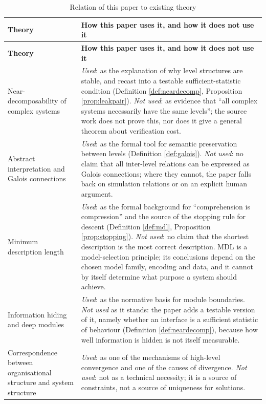\begin{longtable}{L{3.6cm}L{10.8cm}}
\caption{Relation of this paper to existing theory}\label{tab:relations}\\
\toprule
\textbf{Theory} & \textbf{How this paper uses it, and how it does not use it} \\
\midrule
\endfirsthead
\toprule
\textbf{Theory} & \textbf{How this paper uses it, and how it does not use it} \\
\midrule
\endhead
\bottomrule
\endlastfoot
Near-decomposability of complex systems &
  \emph{Used}: as the explanation of why level structures are stable, and recast into a
  testable sufficient-statistic condition (Definition \ref{def:neardecomp}, Proposition
  \ref{prop:leakpair}).
  \emph{Not used}: as evidence that ``all complex systems necessarily have the same
  levels''; the source work does not prove this, nor does it give a general theorem about
  verification cost. \\
Abstract interpretation and Galois connections &
  \emph{Used}: as the formal tool for semantic preservation between levels (Definition
  \ref{def:galois}).
  \emph{Not used}: no claim that all inter-level relations can be expressed as Galois
  connections; where they cannot, the paper falls back on simulation relations or on an
  explicit human argument. \\
Minimum description length &
  \emph{Used}: as the formal background for ``comprehension is compression'' and the source
  of the stopping rule for descent (Definition \ref{def:mdl}, Proposition
  \ref{prop:stopping}).
  \emph{Not used}: no claim that the shortest description is the most correct description.
  MDL is a model-selection principle; its conclusions depend on the chosen model family,
  encoding and data, and it cannot by itself determine what purpose a system should
  achieve. \\
Information hiding and deep modules &
  \emph{Used}: as the normative basis for module boundaries.
  \emph{Not used} as it stands: the paper adds a testable version of it, namely whether an
  interface is a sufficient statistic of behaviour (Definition \ref{def:neardecomp}),
  because how well information is hidden is not itself measurable. \\
Correspondence between organisational structure and system structure &
  \emph{Used}: as one of the mechanisms of high-level convergence and one of the causes of
  divergence.
  \emph{Not used}: not as a technical necessity; it is a source of constraints, not a
  source of uniqueness for solutions. \\

\end{longtable}
